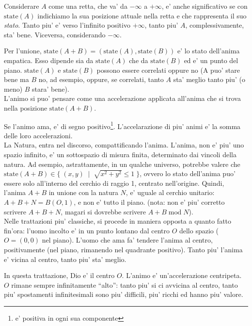 \def\state{\textrm{state}}

Considerare $A$ come una retta, che va' da $-\infty$ a $+\infty$, e' anche significativo se con $\state(A)$ indichiamo la sua posizione attuale nella retta e che rappresenta il suo \emph{stato}. Tanto piu' e' verso l'infinito positivo $+\infty$, tanto piu' $A$, complessivamente, sta' bene. Viceversa, considerando $-\infty$.

Per l'unione, $\state(A+B)=(\state(A),\state(B))$ e' lo stato dell'anima empatica. Esso dipende sia da $\state(A)$ che da $\state(B)$ ed e' un punto del piano. $\state(A)$ e $\state(B)$ possono essere correlati oppure no (A puo' stare bene ma $B$ no, ad esempio, oppure, se correlati, tanto $A$ sta' meglio tanto piu' (o meno) $B$ stara' bene).\\

L'animo si puo' pensare come una accelerazione applicata all'anima che si trova nella posizione $\state(A+B)$.

Se l'animo ama, e' di segno positivo\footnote{e' positiva in ogni sua componente}. L'accelarazione di piu' animi e' la somma delle loro accelerazioni.\\

La Natura, entra nel discorso, compattificando l'anima. L'anima, non e' piu' uno spazio infinito, e' un sottospazio di misura finita, determinato dai vincoli della natura. Ad esempio, astrattamente, in un qualche universo, potrebbe valere che $\state(A+B) \in \{\; (x,y) \;\; | \;\; \sqrt{x^2+y^2} \le 1 \;\}$, ovvero lo stato dell'anima puo' essere solo all'interno del cerchio di raggio 1, centrato nell'origine. Quindi, l'anima $A+B$ in unione con la natura $N$, e' uguale al cerchio unitario: $A+B+N=B(O,1)$, e non e' tutto il piano. (nota: non e' piu' corretto scrivere $A+B+N$, magari si dovrebbe scrivere $A+B\;\textrm{mod}\;N$).\\

Nelle trattazioni piu' classiche, si procede in maniera opposta a quanto fatto fin'ora: l'uomo incolto e' in un punto lontano dal centro $O$ dello spazio ($O=(0,0)$ nel piano). L'uomo che ama fa' tendere l'anima al centro, positivamente (nel piano, rimanendo nel quadrante positivo). Tanto piu' l'anima e' vicina al centro, tanto piu' sta' meglio.

In questa trattazione, Dio e' il centro $O$. L'animo e' un'accelerazione centripeta. $O$ rimane sempre infinitamente ``alto'': tanto piu' si ci avvicina al centro, tanto piu' spostamenti infinitesimali sono piu' difficili, piu' ricchi ed hanno piu' valore.

